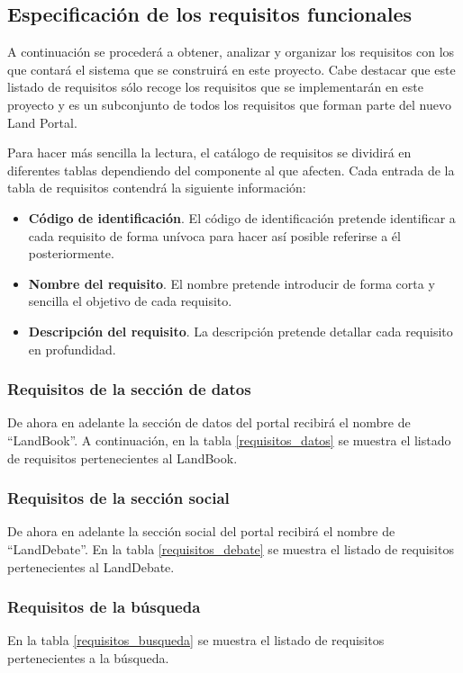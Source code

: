 \subsection{Especificación de los requisitos funcionales}
A continuación se procederá a obtener, analizar y organizar los requisitos con los que contará el sistema que se construirá en este proyecto.  Cabe destacar que este listado de requisitos sólo recoge los requisitos que se implementarán en este proyecto y es un subconjunto de todos los requisitos que forman parte del nuevo Land Portal.

Para hacer más sencilla la lectura, el catálogo de requisitos se dividirá en diferentes tablas dependiendo del componente al que afecten.
Cada entrada de la tabla de requisitos contendrá la siguiente información:
\begin{itemize}
\item \textbf{Código de identificación}. El código de identificación pretende identificar a cada requisito de forma unívoca para hacer así posible referirse a él posteriormente.
\item \textbf{Nombre del requisito}. El nombre pretende introducir de forma corta y sencilla el objetivo de cada requisito.
\item \textbf{Descripción del requisito}. La descripción pretende detallar cada requisito en profundidad.
\end{itemize}

\subsubsection{Requisitos de la sección de datos}
\label{requisitos_seccion_datos}
De ahora en adelante la sección de datos del portal recibirá el nombre de ``LandBook''.  A continuación, en la tabla  \ref{requisitos_datos} se muestra el listado de requisitos pertenecientes al LandBook.


\subsubsection{Requisitos de la sección social}
\label{requisitos_seccion_social}
De ahora en adelante la sección social del portal recibirá el nombre de ``LandDebate''.  En la tabla \ref{requisitos_debate} se muestra el listado de requisitos pertenecientes al LandDebate.


\subsubsection{Requisitos de la búsqueda}
En la tabla \ref{requisitos_busqueda} se muestra el listado de requisitos pertenecientes a la búsqueda.


